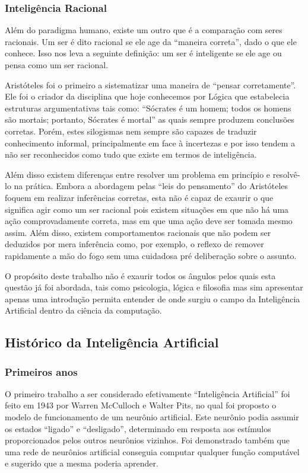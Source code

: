 \documentclass[cic,tc]{iiufrgs}
\begin{document}
\subsubsection{Inteligência Racional}

Além do paradigma humano, existe um outro que é a comparação com seres
racionais. Um ser é dito racional se ele age da ``maneira correta'', dado o que
ele conhece. Isso nos leva a seguinte definição: um ser é inteligente se ele
age ou pensa como um ser racional.

Aristóteles foi o primeiro a sistematizar uma maneira de ``pensar
corretamente''.  Ele foi o criador da disciplina que hoje conhecemos por Lógica
que estabelecia estruturas argumentativas tais como: ``Sócrates é um homem;
todos os homens são mortais; portanto, Sócrates é mortal'' as quais sempre
produzem conclusões corretas. Porém, estes silogismas nem sempre são capazes de
traduzir conhecimento informal, principalmente em face à incertezas e por isso
tendem a não ser reconhecidos como tudo que existe em termos de inteligência.

Além disso existem diferenças entre resolver um problema em princípio e
resolvê-lo na prática. Embora a abordagem pelas ``leis do pensamento'' do
Aristóteles foquem em realizar inferências corretas, esta não é capaz de
exaurir o que significa agir como um ser racional pois existem situações em que
não há uma ação comprovadamente correta, mas em que uma ação deve ser tomada
mesmo assim. Além disso, existem comportamentos racionais que não podem ser
deduzidos por mera inferência como, por exemplo, o reflexo de remover
rapidamente a mão do fogo sem uma cuidadosa pré deliberação sobre o assunto.

O propósito deste trabalho não é exaurir todos os ângulos pelos quais esta
questão já foi abordada, tais como psicologia, lógica e filosofia mas sim
apresentar apenas uma introdução permita entender de onde surgiu o campo da
Inteligência Artificial dentro da ciência da computação.

\subsection{Histórico da Inteligência Artificial}

\subsubsection{Primeiros anos}

O primeiro trabalho a ser considerado efetivamente ``Inteligência Artificial''
foi feito em 1943 por Warren McCulloch e Walter Pits, no qual foi proposto o
modelo de funcionamento de um neurônio artificial.  Este neurônio podia assumir
os estados ``ligado'' e ``desligado'', determinado em resposta aos estímulos
proporcionados pelos outros neurônios vizinhos. Foi demonstrado também que uma
rede de neurônios artificial conseguia computar qualquer função computável e
sugerido que a mesma poderia aprender.
\end{document}
